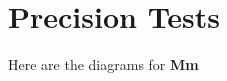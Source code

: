 \documentclass[../../main.tex]{subfiles}
\begin{document}
\section{Precision Tests}
Here are the diagrams for {\bf Mm}
\end{document}
